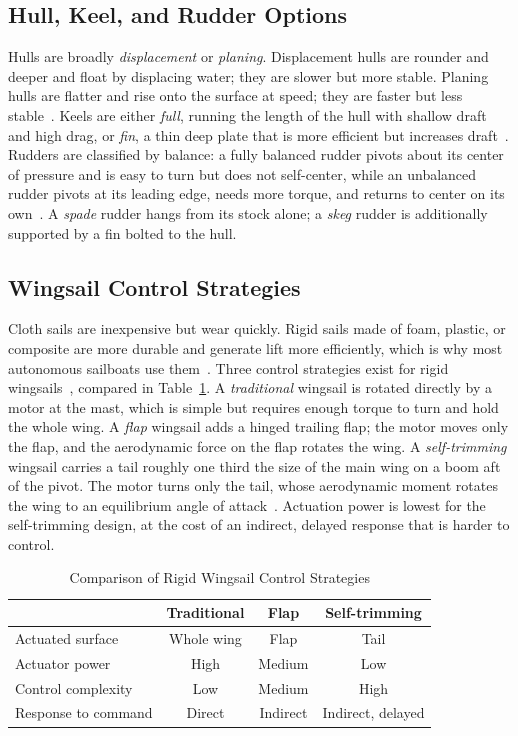 \subsection{Hull, Keel, and Rudder Options}
Hulls are broadly \emph{displacement} or \emph{planing}. Displacement hulls
are rounder and deeper and float by displacing water; they are slower but
more stable. Planing hulls are flatter and rise onto the surface at speed;
they are faster but less stable~\cite{skene2001}. Keels are either
\emph{full}, running the length of the hull with shallow draft and high drag,
or \emph{fin}, a thin deep plate that is more efficient but increases
draft~\cite{sailingcats}. Rudders are classified by balance: a fully balanced
rudder pivots about its center of pressure and is easy to turn but does not
self-center, while an unbalanced rudder pivots at its leading edge, needs more
torque, and returns to center on its own~\cite{noahrudder}. A \emph{spade}
rudder hangs from its stock alone; a \emph{skeg} rudder is additionally
supported by a fin bolted to the hull.

\subsection{Wingsail Control Strategies}
Cloth sails are inexpensive but wear quickly. Rigid sails made of foam,
plastic, or composite are more durable and generate lift more efficiently,
which is why most autonomous sailboats use them~\cite{silva2019,sun2025}.
Three control strategies exist for rigid wingsails~\cite{sun2025}, compared
in Table~\ref{tab:sailtypes}. A \emph{traditional} wingsail is rotated
directly by a motor at the mast, which is simple but requires enough torque
to turn and hold the whole wing. A \emph{flap} wingsail adds a hinged trailing
flap; the motor moves only the flap, and the aerodynamic force on the flap
rotates the wing. A \emph{self-trimming} wingsail carries a tail roughly one
third the size of the main wing on a boom aft of the pivot. The motor turns
only the tail, whose aerodynamic moment rotates the wing to an equilibrium
angle of attack~\cite{elkaim2008,sailwings}. Actuation power is lowest for
the self-trimming design, at the cost of an indirect, delayed response that is
harder to control.

\begin{table}[!t]
\caption{Comparison of Rigid Wingsail Control Strategies}
\label{tab:sailtypes}
\centering
\begin{tabular}{@{}lccc@{}}
\toprule
 & Traditional & Flap & Self-trimming \\
\midrule
Actuated surface    & Whole wing & Flap & Tail \\
Actuator power      & High       & Medium & Low \\
Control complexity  & Low        & Medium & High \\
Response to command & Direct     & Indirect & Indirect, delayed \\
\bottomrule
\end{tabular}
\end{table}
